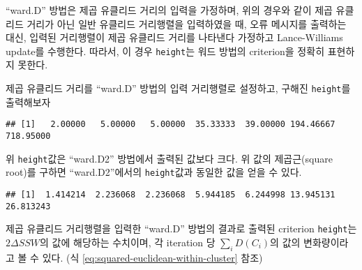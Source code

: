 \documentclass[]{book}
\newenvironment{Shaded}{\begin{snugshade}}{\end{snugshade}}
\newcommand{\DataTypeTok}[1]{\textcolor[rgb]{0.13,0.29,0.53}{#1}}
\newcommand{\DecValTok}[1]{\textcolor[rgb]{0.00,0.00,0.81}{#1}}
\newcommand{\KeywordTok}[1]{\textcolor[rgb]{0.13,0.29,0.53}{\textbf{#1}}}
\newcommand{\NormalTok}[1]{#1}
\newcommand{\OperatorTok}[1]{\textcolor[rgb]{0.81,0.36,0.00}{\textbf{#1}}}
\newcommand{\StringTok}[1]{\textcolor[rgb]{0.31,0.60,0.02}{#1}}
\begin{document}
``ward.D'' 방법은 제곱 유클리드 거리의 입력을 가정하며, 위의 경우와 같이 제곱 유클리드 거리가 아닌 일반 유클리드 거리행렬을 입력하였을 때, 오류 메시지를 출력하는 대신, 입력된 거리행렬이 제곱 유클리드 거리를 나타낸다 가정하고 Lance-Williams update를 수행한다. 따라서, 이 경우 \texttt{height}는 워드 방법의 criterion을 정확히 표현하지 못한다.

제곱 유클리드 거리를 ``ward.D'' 방법의 입력 거리행렬로 설정하고, 구해진 \texttt{height}를 출력해보자

\begin{Shaded}
\end{Shaded}

\begin{verbatim}
## [1]   2.00000   5.00000   5.00000  35.33333  39.00000 194.46667 718.95000
\end{verbatim}

위 \texttt{height}값은 ``ward.D2'' 방법에서 출력된 값보다 크다. 위 값의 제곱근(square root)를 구하면 ``ward.D2''에서의 \texttt{height}값과 동일한 값을 얻을 수 있다.

\begin{Shaded}
\end{Shaded}

\begin{verbatim}
## [1]  1.414214  2.236068  2.236068  5.944185  6.244998 13.945131 26.813243
\end{verbatim}

제곱 유클리드 거리행렬을 입력한 ``ward.D'' 방법의 결과로 출력된 criterion \texttt{height}는 \(2 \Delta SSW\)의 값에 해당하는 수치이며, 각 iteration 당 \(\sum_i D(C_i)\)의 값의 변화량이라고 볼 수 있다. (식 \eqref{eq:squared-euclidean-within-cluster} 참조)
\end{document}
